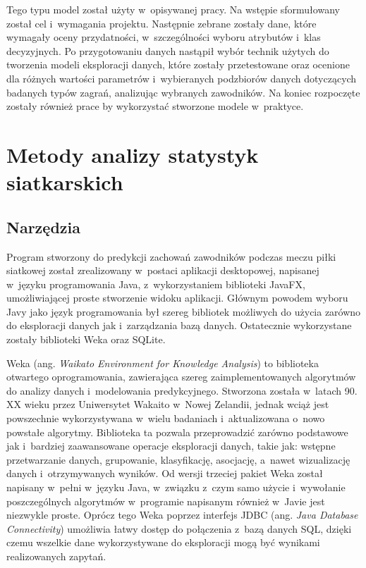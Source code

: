 \documentclass[a4paper,twoside,12pt]{book}
\newcommand{\obcy}[1]{\emph{#1}}
\renewcommand{\ang}[1]{{\selectlanguage{british}\obcy{#1}}}
\begin{document}
Tego typu model został użyty w~opisywanej pracy. Na wstępie sformułowany został cel i~wymagania projektu. Następnie zebrane zostały dane, które wymagały oceny przydatności, w~szczególności wyboru atrybutów i~klas decyzyjnych. Po przygotowaniu danych nastąpił wybór technik użytych do tworzenia modeli eksploracji danych, które zostały przetestowane oraz ocenione dla różnych wartości parametrów i~wybieranych podzbiorów danych dotyczących badanych typów zagrań, analizując wybranych zawodników. Na koniec rozpoczęte zostały również prace by wykorzystać stworzone modele w~praktyce.

\chapter{Metody analizy statystyk siatkarskich}
\label{roz:przedmiot-pracy}

\section{Narzędzia}
\label{roz:narzedzia}

Program stworzony do predykcji zachowań zawodników podczas meczu piłki siatkowej został zrealizowany w~postaci aplikacji desktopowej, napisanej w~języku programowania Java, z~wykorzystaniem biblioteki JavaFX, umożliwiającej proste stworzenie widoku aplikacji. Głównym powodem wyboru Javy jako język programowania był szereg bibliotek możliwych do użycia zarówno do eksploracji danych jak i~zarządzania bazą danych. Ostatecznie wykorzystane zostały biblioteki Weka oraz SQLite.

Weka (ang. \ang{Waikato Environment for Knowledge Analysis}) to biblioteka otwartego oprogramowania, zawierająca szereg zaimplementowanych algorytmów do analizy danych i~modelowania predykcyjnego. Stworzona została w~latach 90. XX wieku przez Uniwersytet Wakaito w~Nowej Zelandii, jednak wciąż jest powszechnie wykorzystywana w~wielu badaniach i~aktualizowana o~nowo powstałe algorytmy. Biblioteka ta pozwala przeprowadzić zarówno podstawowe jak i~bardziej zaawansowane operacje eksploracji danych, takie jak: wstępne przetwarzanie danych, grupowanie, klasyfikację, asocjację, a~nawet wizualizację danych i~otrzymywanych wyników. Od wersji trzeciej pakiet Weka został napisany w~pełni w~języku Java, w~związku z~czym samo użycie i~wywołanie poszczególnych algorytmów w~programie napisanym również w~Javie jest niezwykle proste. Oprócz tego Weka poprzez interfejs JDBC (ang. \ang{Java Database Connectivity}) umożliwia łatwy dostęp do połączenia z~bazą danych SQL, dzięki czemu wszelkie dane wykorzystywane do eksploracji mogą być wynikami realizowanych zapytań.
\end{document}
